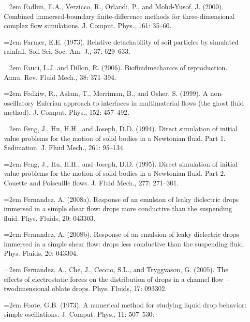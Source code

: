 \documentclass[11pt,a4paper,openany,fontset=none]{ctexbook}
\begin{document}
\par\hangindent=2em Fadlun, E.A., Verzicco, R., Orlandi, P., and Mohd-Yusof, J. (2000). Combined immersed-boundary finite-difference methods for three-dimensional complex flow simulations. J. Comput. Phys., 161: 35--60.

\par\hangindent=2em Farmer, E.E. (1973). Relative detachability of soil particles by simulated rainfall. Soil Sci. Soc. Am. J., 37: 629--633.

\par\hangindent=2em Fauci, L.J. and Dillon, R. (2006). Biofluidmechanics of reproduction. Annu. Rev. Fluid Mech., 38: 371--394.

\par\hangindent=2em Fedkiw, R., Aslam, T., Merriman, B., and Osher, S. (1999). A non-oscillatory Eulerian approach to interfaces in multimaterial flows (the ghost fluid method). J. Comput. Phys., 152: 457--492.

\par\hangindent=2em Feng, J., Hu, H.H., and Joseph, D.D. (1994). Direct simulation of initial value problems for the motion of solid bodies in a Newtonian fluid. Part 1. Sedimation. J. Fluid Mech., 261: 95--134.

\par\hangindent=2em Feng, J., Hu, H.H., and Joseph, D.D. (1995). Direct simulation of initial value problems for the motion of solid bodies in a Newtonian fluid. Part 2. Couette and Poiseuille flows. J. Fluid Mech., 277: 271--301.

\par\hangindent=2em Fernandez, A. (2008a). Response of an emulsion of leaky dielectric drops immersed in a simple shear flow: drops more conductive than the suspending fluid. Phys. Fluids, 20: 043303.

\par\hangindent=2em Fernandez, A. (2008b). Response of an emulsion of leaky dielectric drops immersed in a simple shear flow: drops less conductive than the suspending fluid. Phys. Fluids, 20: 043304.

\par\hangindent=2em Fernandez, A., Che, J., Ceccio, S.L., and Tryggvason, G. (2005). The effects of electrostatic forces on the distribution of drops in a channel flow -- twodimensional oblate drops. Phys. Fluids, 17: 093302.

\par\hangindent=2em Foote, G.B. (1973). A numerical method for studying liquid drop behavior: simple oscillations. J. Comput. Phys., 11: 507--530.
\end{document}
